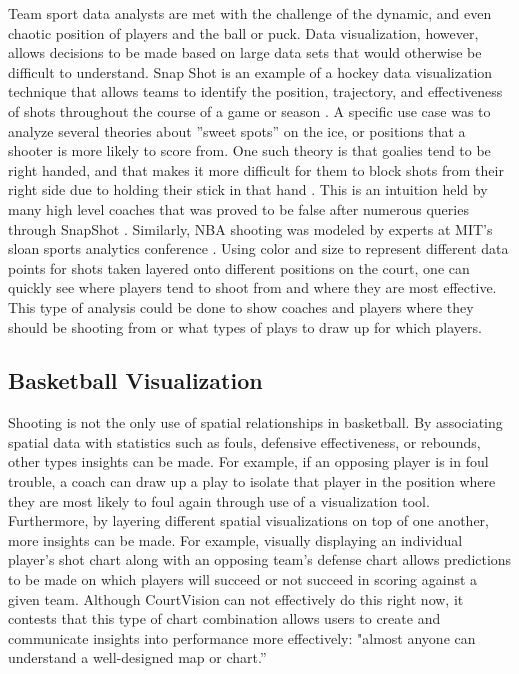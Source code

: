 \documentclass[sigconf]{acmart}
\begin{document}
Team sport data analysts are met with the challenge of the dynamic, and even chaotic position of players and the ball or puck. Data visualization, however, allows decisions to be made based on large data sets that would otherwise be difficult to understand. Snap Shot is an example of a hockey data visualization technique that allows teams to identify the position, trajectory, and effectiveness of shots throughout the course of a game or season \cite{SnapShot}. A specific use case was to analyze several theories about ''sweet spots'' on the ice, or positions that a shooter is more likely to score from. One such theory is that goalies tend to be right handed, and that makes it more difficult for them to block shots from their right side due to holding their stick in that hand \cite{SnapShot}. This is an intuition held by many high level coaches that was proved to be false after numerous queries through SnapShot \cite{SnapShot}. Similarly, NBA shooting was modeled by experts at MIT's sloan sports analytics conference \cite{CourtVision}. Using color and size to represent different data points for shots taken layered onto different positions on the court, one can quickly see where players tend to shoot from and where they are most effective. This type of analysis could be done to show coaches and players where they should be shooting from or what types of plays to draw up for which players.

\subsection{Basketball Visualization}

Shooting is not the only use of spatial relationships in basketball. By associating spatial data with statistics such as fouls, defensive effectiveness, or rebounds, other types insights can be made. For example, if an opposing player is in foul trouble, a coach can draw up a play to isolate that player in the position where they are most likely to foul again through use of a visualization tool. Furthermore, by layering different spatial visualizations on top of one another, more insights can be made. For example, visually displaying an individual player's shot chart along with an opposing team's defense chart allows predictions to be made on which players will succeed or not succeed in scoring against a given team\cite{CourtVision}. Although CourtVision can not effectively do this right now, it contests that this type of chart combination allows users to create and communicate insights into performance more effectively: "almost anyone can understand a well-designed map or chart.''\cite{CourtVision}
\end{document}
